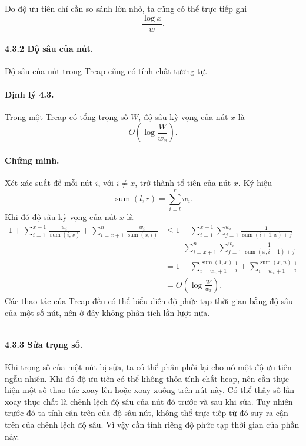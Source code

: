 \documentclass[11pt]{article}
\newcommand{\qedmark}{\hfill\rule{0.7ex}{0.7ex}}
\begin{document}
Do độ ưu tiên chỉ cần so sánh lớn nhỏ, ta cũng có thể trực tiếp ghi
\[
  \frac{\log x}{w}.
\]

\paragraph{4.3.2 Độ sâu của nút.}
Độ sâu của nút trong Treap cũng có tính chất tương tự.

\paragraph{Định lý 4.3.}
Trong một Treap có tổng trọng số \(W\), độ sâu kỳ vọng của nút \(x\) là
\[
  O\left(\log\frac{W}{w_x}\right).
\]

\paragraph{Chứng minh.}
Xét xác suất để mỗi nút \(i\), với \(i\ne x\), trở thành tổ tiên của nút \(x\).
Ký hiệu
\[
  \operatorname{sum}(l,r)=\sum_{i=l}^{r}w_i.
\]
Khi đó độ sâu kỳ vọng của nút \(x\) là
\[
\begin{aligned}
  1+\sum_{i=1}^{x-1}\frac{w_i}{\operatorname{sum}(i,x)}
    +\sum_{i=x+1}^{n}\frac{w_i}{\operatorname{sum}(x,i)}
  &\le
  1+\sum_{i=1}^{x-1}\sum_{j=1}^{w_i}
    \frac{1}{\operatorname{sum}(i+1,x)+j}\\
  &\quad+\sum_{i=x+1}^{n}\sum_{j=1}^{w_i}
    \frac{1}{\operatorname{sum}(x,i-1)+j}\\
  &=1+\sum_{i=w_x+1}^{\operatorname{sum}(1,x)}\frac{1}{i}
    +\sum_{i=w_x+1}^{\operatorname{sum}(x,n)}\frac{1}{i}\\
  &=O\left(\log\frac{W}{w_x}\right).
\end{aligned}
\]
Các thao tác của Treap đều có thể biểu diễn độ phức tạp thời gian bằng độ sâu
của một số nút, nên ở đây không phân tích lần lượt nữa. \qedmark

\paragraph{4.3.3 Sửa trọng số.}
Khi trọng số của một nút bị sửa, ta có thể phân phối lại cho nó một độ ưu tiên
ngẫu nhiên. Khi đó độ ưu tiên có thể không thỏa tính chất heap, nên cần thực
hiện một số thao tác xoay lên hoặc xoay xuống trên nút này. Có thể thấy số lần
xoay thực chất là chênh lệch độ sâu của nút đó trước và sau khi sửa. Tuy nhiên
trước đó ta tính cận trên của độ sâu nút, không thể trực tiếp từ đó suy ra cận
trên của chênh lệch độ sâu. Vì vậy cần tính riêng độ phức tạp thời gian của
phần này.
\end{document}
